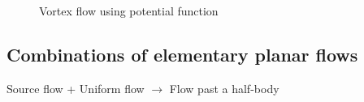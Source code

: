 \begin{figure}[h]
\begin{center}
\end{center}
\caption{Vortex flow using potential function}
\label{planarvortexflow}
\end{figure}



\subsection{Combinations of elementary planar flows}

Source flow + Uniform flow $\rightarrow$ Flow past a half-body

